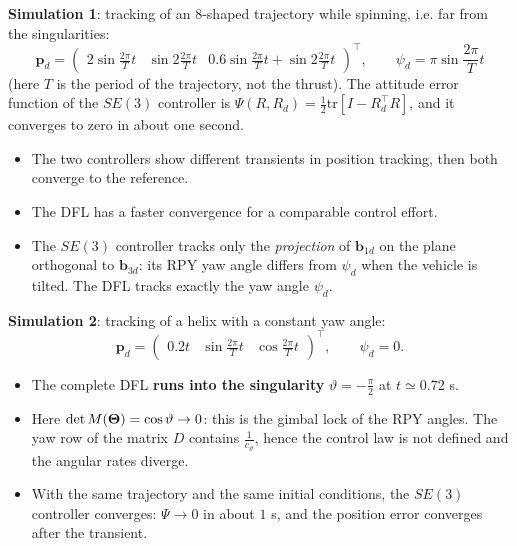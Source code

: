 \documentclass[10pt, a4paper]{report}
\begin{document}
\noindent \textbf{Simulation 1}: tracking of an 8-shaped trajectory while spinning, i.e. far from the singularities:\begin{equation}
    \mathbf p_d=\begin{pmatrix}
        2\sin\frac{2\pi}{T}t&\sin2\frac{2\pi}{T}t&0.6\sin\frac{2\pi}{T}t+\sin2\frac{2\pi}{T}t
    \end{pmatrix}^\top,\quad\quad\psi_d=\pi\sin\frac{2\pi}{T}t
\end{equation}
(here $T$ is the period of the trajectory, not the thrust). The attitude error function of the $SE(3)$ controller is $\Psi(R,R_d)=\frac{1}{2}\text{tr}\left[I-R_d^\top R\right]$, and it converges to zero in about one second.\begin{itemize}
    \item The two controllers show different transients in position tracking, then both converge to the reference.
    \item The DFL has a faster convergence for a comparable control effort.
    \item The $SE(3)$ controller tracks only the \textit{projection} of $\mathbf b_{1d}$ on the plane orthogonal to $\mathbf b_{3d}$: its RPY yaw angle differs from $\psi_d$ when the vehicle is tilted. The DFL tracks exactly the yaw angle $\psi_d$.
\end{itemize}
\noindent \textbf{Simulation 2}: tracking of a helix with a constant yaw angle:\begin{equation}
    \mathbf p_d=\begin{pmatrix}
        0.2t&\sin\frac{2\pi}{T}t&\cos\frac{2\pi}{T}t
    \end{pmatrix}^\top,\quad\quad\psi_d=0.
\end{equation}
\begin{itemize}
    \item The complete DFL \textbf{runs into the singularity} $\vartheta=-\frac{\pi}{2}$ at $t\simeq0.72$ s.
    \item Here $\det M({\boldsymbol{\Theta}})=\cos\vartheta\to0$: this is the gimbal lock of the RPY angles. The yaw row of the matrix $D$ contains $\frac{1}{c_\vartheta}$, hence the control law is not defined and the angular rates diverge.
    \item With the same trajectory and the same initial conditions, the $SE(3)$ controller converges: $\Psi\to0$ in about $1$ s, and the position error converges after the transient.
\end{itemize}
\end{document}
